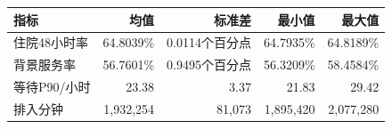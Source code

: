 \begin{tabular}{lrrrr}
\toprule
指标 & 均值 & 标准差 & 最小值 & 最大值 \\
\midrule
住院48小时率 & 64.8039\% & 0.0114个百分点 & 64.7935\% & 64.8189\% \\
背景服务率 & 56.7601\% & 0.9495个百分点 & 56.3209\% & 58.4584\% \\
等待P90/小时 & 23.38 & 3.37 & 21.83 & 29.42 \\
排入分钟 & 1,932,254 & 81,073 & 1,895,420 & 2,077,280 \\
\bottomrule
\end{tabular}
